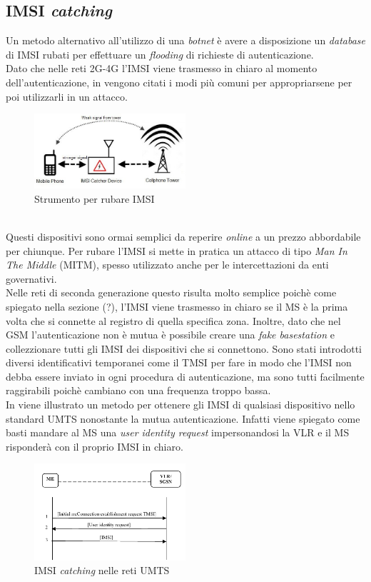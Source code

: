 \subsection{IMSI \textit{catching}}
Un metodo alternativo all'utilizzo di una \textit{botnet} è avere a disposizione un \textit{database} di IMSI rubati per effettuare un \textit{flooding} di richieste di autenticazione.\\
Dato che nelle reti 2G-4G l'IMSI viene trasmesso in chiaro al momento dell'autenticazione, in \cite{imsi-catcher} vengono citati i modi più comuni per appropriarsene per poi utilizzarli in un 
attacco.
\begin{figure}[h]
    \centering
    \includegraphics[width=0.5\textwidth]{images/imsi-catcher.jpg}
    \caption{Strumento per rubare IMSI}
\end{figure}\\
Questi dispositivi sono ormai semplici da reperire \textit{online} a un prezzo abbordabile per chiunque. Per rubare l'IMSI si mette in pratica un attacco di tipo \textit{Man In The Middle} (MITM), spesso utilizzato
anche per le intercettazioni da enti governativi.\\
Nelle reti di seconda generazione questo risulta molto semplice poichè come spiegato nella sezione (?), l'IMSI viene trasmesso in chiaro se il MS è la prima volta che si connette al registro di quella specifica
zona. Inoltre, dato che nel GSM l'autenticazione non è mutua è possibile creare una \textit{fake basestation} e collezzionare tutti gli IMSI dei dispositivi che si connettono.
Sono stati introdotti diversi identificativi temporanei come il TMSI per fare in modo che l'IMSI non debba essere inviato in ogni procedura di autenticazione, ma sono tutti facilmente raggirabili poichè cambiano con una
frequenza troppo bassa.\\
In \cite{dos-imsi} viene illustrato un metodo per ottenere gli IMSI di qualsiasi dispositivo nello standard UMTS nonostante la mutua autenticazione. Infatti viene spiegato come basti mandare al MS una \textit{user identity request} impersonandosi 
la VLR e il MS risponderà con il proprio IMSI in chiaro.
\begin{figure}[h]
    \centering
    \includegraphics[width=0.5\textwidth]{images/imsi-catch-umts.png}
    \caption{IMSI \textit{catching} nelle reti UMTS\cite{dos-imsi}}
\end{figure}\\

